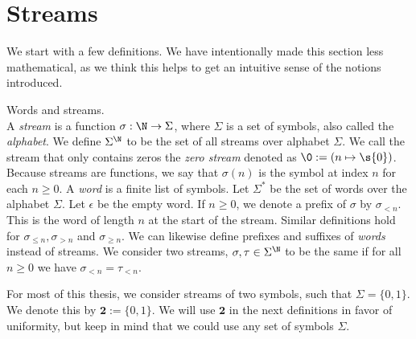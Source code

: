 \section{Streams}

We start with a few definitions. We have intentionally made this section less mathematical, as we think this helps to get an intuitive sense of the notions introduced. 

\begin{definition}{Words and streams.}\\
	A \textit{stream} is a function $\sigma: \N \to \Sigma$, where $\Sigma$ is a set of symbols, also called the \textit{alphabet}. We define $\Sigma^{\N}$ to be the set of all streams over alphabet $\Sigma$. We call the stream that only contains zeros the \textit{zero stream} denoted as $\0 := (n \mapsto \s{0})$. Because streams are functions, we say that $\sigma(n)$ is the symbol at index $n$ for each $n\geq0$. A \textit{word} is a finite list of symbols. Let $\Sigma^{*}$ be the set of words over the alphabet $\Sigma$. Let $\epsilon$ be the empty word. If $n\geq0$, we denote a prefix of $\sigma$ by $\sigma_{< n}$. This is the word of length $n$ at the start of the stream. Similar definitions hold for $\sigma_{\leq n},\sigma_{>n}$ and $\sigma_{\geq n}$. We can likewise define prefixes and suffixes of \textit{words} instead of streams. We consider two streams, $\sigma, \tau\in\Sigma^{\N}$ to be the same if for all $n\geq 0$ we have $\sigma_{< n} = \tau_{< n}$.
\end{definition}

For most of this thesis, we consider streams of two symbols, such that $\Sigma = \{0,1\}$. We denote this by $\mathbf{2} := \{0,1\}$. We will use $\mathbf{2}$ in the next definitions in favor of uniformity, but keep in mind that we could use any set of symbols $\Sigma$. 


